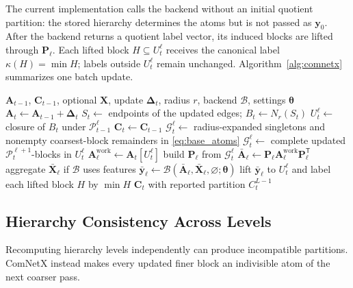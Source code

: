 \documentclass{ieeeaccess}
\begin{document}
The current implementation calls the backend without an initial quotient
partition: the stored hierarchy determines the atoms but is not passed as
$\bm y_0$. After the backend returns a quotient label vector, its induced blocks are
lifted through $\bm P_\ell$. Each lifted block $H\subseteq U_t^\ell$ receives
the canonical label $\kappa(H)=\min H$; labels outside $U_t^\ell$ remain
unchanged. Algorithm~\ref{alg:comnetx} summarizes one batch update.

\begin{algorithm}[t]
\caption{ComNetX update for one batch}
\label{alg:comnetx}
\begin{algorithmic}[1]
\Require $\bm{A}_{t-1}$, $\bm{C}_{t-1}$, optional $\bm{X}$, update
$\bm{\Delta}_t$, radius $r$, backend $\mathcal{B}$, settings $\bm\theta$
\State $\bm{A}_t\gets\bm{A}_{t-1}+\bm{\Delta}_t$
\State $S_t\gets$ endpoints of the updated edges; $B_t\gets N_r(S_t)$
    \State $U_t^\ell\gets$ closure of $B_t$ under
    $\mathcal{P}_{t-1}^\ell$ 
\EndFor
\State $\bm{C}_t\gets\bm{C}_{t-1}$
        \State $\mathcal{G}_t^\ell\gets$ radius-expanded singletons and nonempty
        coarsest-block remainders in \eqref{eq:base_atoms}
    \Else
        \State $\mathcal{G}_t^\ell\gets$ complete updated
        $\mathcal{P}_t^{\ell+1}$-blocks in $U_t^\ell$
    \EndIf
    \State $\bm{A}^{\mathrm{work}}_\ell\gets\bm{A}_t[U_t^\ell]$
    \State build $\bm{P}_\ell$ from $\mathcal{G}_t^\ell$
    \State $\bar{\bm{A}}_\ell\gets
    \bm{P}_\ell\bm{A}^{\mathrm{work}}_\ell\bm{P}_\ell^{\mathsf T}$
    \State aggregate $\bar{\bm{X}}_\ell$ if $\mathcal{B}$ uses features
    \State $\bar{\bm{y}}_\ell\gets
    \mathcal{B}(\bar{\bm{A}}_\ell,\bar{\bm{X}}_\ell,\varnothing;\bm\theta)$
    \State lift $\bar{\bm{y}}_\ell$ to $U_t^\ell$ and label each lifted
    block $H$ by $\min H$
\EndFor
\State \Return $\bm{C}_t$ with reported partition $C_t^{L-1}$
\end{algorithmic}
\end{algorithm}

\subsection{Hierarchy Consistency Across Levels}

Recomputing hierarchy levels independently can produce incompatible
partitions. ComNetX instead makes every updated finer block an indivisible atom
of the next coarser pass.
\end{document}
